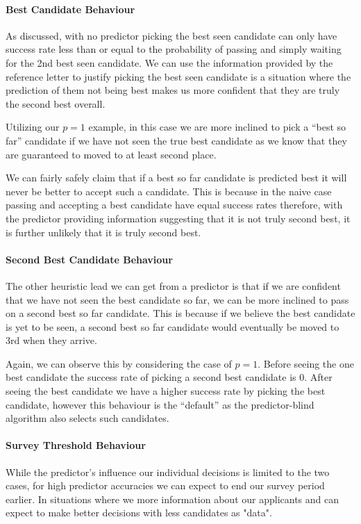 \documentclass[a4paper,11pt]{article}
\begin{document}
\paragraph{Best Candidate Behaviour}
As discussed, with no predictor picking the best seen candidate can only have success rate less than or equal to the probability of passing and simply waiting for the 2nd best seen candidate. We can use the information provided by the reference letter to justify picking the best seen candidate is a situation where the prediction of them not being best makes us more confident that they are truly the second best overall.

Utilizing our $p=1$ example, in this case we are more inclined to pick a ``best so far'' candidate if we have not seen the true best candidate as we know that they are guaranteed to moved to at least second place.

We can fairly safely claim that if a best so far candidate is predicted best it will never be better to accept such a candidate. This is because in the naive case passing and accepting a best candidate have equal success rates therefore, with the predictor providing information suggesting that it is not truly second best, it is further unlikely that it is truly second best.

\paragraph{Second Best Candidate Behaviour}
The other heuristic lead we can get from a predictor is that if we are confident that we have not seen the best candidate so far, we can be more inclined to pass on a second best so far candidate. This is because if we believe the best candidate is yet to be seen, a second best so far candidate would eventually be moved to 3rd when they arrive. 

Again, we can observe this by considering the case of $p = 1$. Before seeing the one best candidate the success rate of picking a second best candidate is 0. After seeing the best candidate we have a higher success rate by picking the best candidate, however this behaviour is the ``default'' as the predictor-blind algorithm also selects such candidates.

\paragraph{Survey Threshold Behaviour}

While the predictor's influence our individual decisions is limited to the two cases, for high predictor accuracies we can expect to end our survey period earlier. In situations where we more information about our applicants and can expect to make better decisions with less candidates as "data".
\end{document}
